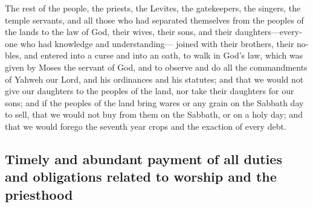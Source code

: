 \begin{paracol}{2}
\begin{otherlanguage}{english}
 The rest of the people, the priests, the Levites, the
gatekeepers, the singers, the temple servants, and all those who had
separated themselves from the peoples of the lands to the law of God,
their wives, their sons, and their daughters---everyone who had
knowledge and understanding---  joined with their
brothers, their nobles, and entered into a curse and into an oath, to
walk in God's law, which was given by Moses the servant of God, and to
observe and do all the commandments of Yahweh our Lord, and his
ordinances and his statutes;  and that we would not give
our daughters to the peoples of the land, nor take their daughters for
our sons;  and if the peoples of the land bring wares or
any grain on the Sabbath day to sell, that we would not buy from them on
the Sabbath, or on a holy day; and that we would forego the seventh year
crops and the exaction of every debt.

\hypertarget{timely-and-abundant-payment-of-all-duties-and-obligations-related-to-worship-and-the-priesthood}{%
\subsection{Timely and abundant payment of all duties and obligations
related to worship and the
priesthood}\label{timely-and-abundant-payment-of-all-duties-and-obligations-related-to-worship-and-the-priesthood}}


\end{otherlanguage}
\end{paracol}
